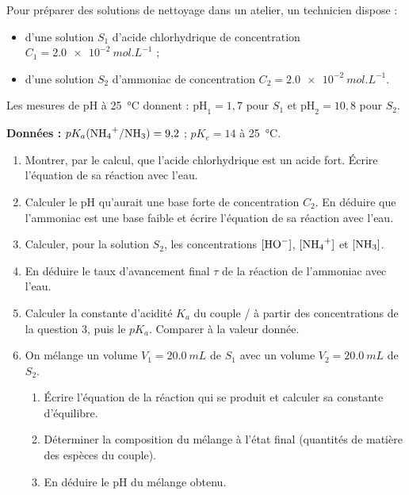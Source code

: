 \documentclass[11pt]{article}
\begin{document}
\begin{exercice}
Pour préparer des solutions de nettoyage dans un atelier, un technicien dispose :
\begin{itemize}
\item d'une solution $S_1$ d'acide chlorhydrique de concentration $C_1 = \SI{2,0e-2}{mol.L^{-1}}$ ;
\item d'une solution $S_2$ d'ammoniac  de concentration $C_2 = \SI{2,0e-2}{mol.L^{-1}}$.
\end{itemize}
Les mesures de pH à \SI{25}{\celsius} donnent : $\mathrm{pH}_1 = 1{,}7$ pour $S_1$ et $\mathrm{pH}_2 = 10{,}8$ pour $S_2$.

\textbf{Données :} $pK_a(\ce{NH4+}/\ce{NH3}) = 9{,}2$ ; $pK_e = 14$ à \SI{25}{\celsius}.
\begin{enumerate}
\item Montrer, par le calcul, que l'acide chlorhydrique est un acide fort. Écrire l'équation de sa réaction avec l'eau.
\item Calculer le pH qu'aurait une base forte de concentration $C_2$. En déduire que l'ammoniac est une base faible et écrire l'équation de sa réaction avec l'eau.
\item Calculer, pour la solution $S_2$, les concentrations $[\ce{HO-}]$, $[\ce{NH4+}]$ et $[\ce{NH3}]$.
\item En déduire le taux d'avancement final $\tau$ de la réaction de l'ammoniac avec l'eau.
\item Calculer la constante d'acidité $K_a$ du couple / à partir des concentrations de la question 3, puis le $pK_a$. Comparer à la valeur donnée.
\item On mélange un volume $V_1 = \SI{20,0}{mL}$ de $S_1$ avec un volume $V_2 = \SI{20,0}{mL}$ de $S_2$.
\begin{enumerate}
\item Écrire l'équation de la réaction qui se produit et calculer sa constante d'équilibre.
\item Déterminer la composition du mélange à l'état final (quantités de matière des espèces du couple).
\item En déduire le pH du mélange obtenu.
\end{enumerate}
\end{enumerate}
\end{exercice}



\newpage
\end{document}
